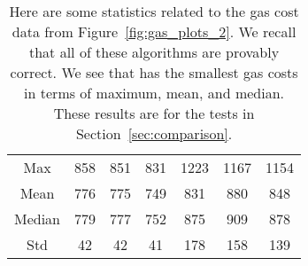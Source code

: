 \begin{table}[t]
\centering
\begin{tabular}{|c|
    |S[table-format=3.0]|S[table-format=3.0]
    |S[table-format=3.0]|S[table-format=4.0]
    |S[table-format=4.0]|S[table-format=4.0]|}
\hline
    & \UnrolledOne{} & \UnrolledTwo{} &
     \UnrolledThree{} &
    \WhileOne{} & \WhileTwo{} & \WhileThree{} \\
\hline
Max    & 858 & 851 &  831 & 1223 & 1167 & 1154 \\
Mean   & 776 & 775 &  749 &  831 &  880 &  848 \\
Median & 779 & 777 &  752 &  875 &  909 &  878 \\
Std    &  42 &  42 &   41 &  178 &  158 &  139 \\
\hline
\end{tabular}
\caption[Gas Costs Statistics 2]{Here are some statistics
    related to the gas cost data from Figure~\ref{fig:gas_plots_2}.
    We recall that all of these algorithms are provably correct.
    We see that \UnrolledThree{} has the smallest gas costs
    in terms of maximum, mean, and median.
    These results are for the tests in Section~\ref{sec:comparison}.
    }
\label{table:gas_costs_2}
\end{table}
